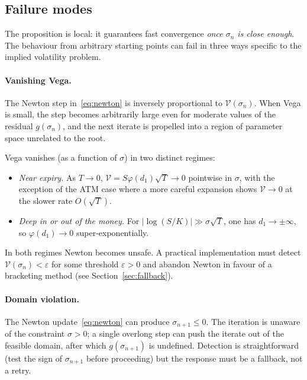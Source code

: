 \documentclass[11pt,a4paper]{article}
\theoremstyle{plain}
\theoremstyle{definition}
\theoremstyle{remark}
\begin{document}
\subsection{Failure modes}

The proposition is local: it guarantees fast convergence \emph{once
\(\sigma_n\) is close enough}. The behaviour from arbitrary starting
points can fail in three ways specific to the implied volatility
problem.

\paragraph{Vanishing Vega.}
The Newton step in~\eqref{eq:newton} is inversely proportional to
\(\mathcal{V}(\sigma_n)\). When Vega is small, the step becomes
arbitrarily large even for moderate values of the residual
\(g(\sigma_n)\), and the next iterate is propelled into a region of
parameter space unrelated to the root.

Vega vanishes (as a function of \(\sigma\)) in two distinct regimes:

\begin{itemize}
    \item \emph{Near expiry.} As \(T \to 0\), \(\mathcal{V} = S\varphi(d_1)\sqrt{T} \to 0\)
    pointwise in \(\sigma\), with the exception of the ATM case where
    a more careful expansion shows \(\mathcal{V} \to 0\) at the slower
    rate \(O(\sqrt{T})\).
    \item \emph{Deep in or out of the money.} For \(|\log(S/K)| \gg \sigma\sqrt{T}\),
    one has \(d_1 \to \pm\infty\), so \(\varphi(d_1) \to 0\)
    super-exponentially.
\end{itemize}

In both regimes Newton becomes unsafe. A practical implementation
must detect \(\mathcal{V}(\sigma_n) < \varepsilon\) for some
threshold \(\varepsilon > 0\) and abandon Newton in favour of a
bracketing method (see Section~\ref{sec:fallback}).

\paragraph{Domain violation.}
The Newton update~\eqref{eq:newton} can produce
\(\sigma_{n+1} \leq 0\). The iteration is unaware of the constraint
\(\sigma > 0\); a single overlong step can push the iterate out of
the feasible domain, after which \(g(\sigma_{n+1})\) is undefined.
Detection is straightforward (test the sign of \(\sigma_{n+1}\) before
proceeding) but the response must be a fallback, not a retry.
\end{document}
